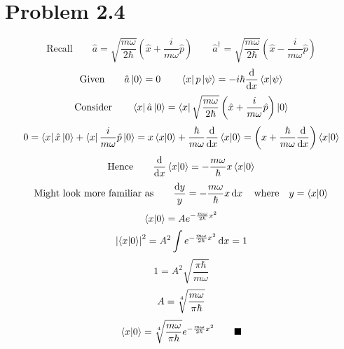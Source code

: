 \documentclass{amsart}
\begin{document}
\section*{Problem 2.4}
\[\text{Recall}\qquad\hat{a}  = \sqrt{\frac{m\omega}{2\hbar}}\left(\hat{x} + \frac{i}{m\omega}\hat{p}\right) \qquad\hat{a}^\dagger  = \sqrt{\frac{m\omega}{2\hbar}}\left(\hat{x} - \frac{i}{m\omega}\hat{p}\right)\]
\[\text{Given}\qquad\hat{a}\ket{0}=0\qquad\bra{x}p\ket{\psi} = -i\hbar \dv{x}\bra{x}\ket{\psi}\]
\[\text{Consider}\qquad\bra{x}\hat{a}\ket{0}= \bra{x}\sqrt{\frac{m\omega}{2\hbar}}\left(\hat{x} + \frac{i}{m\omega}\hat{p}\right)\ket{0}\]
\[0= \bra{x}\hat{x}\ket{0} + \bra{x}\frac{i}{m\omega}\hat{p}\ket{0}=x\bra{x}\ket{0}+\frac{\hbar}{m\omega}\dv{x}\bra{x}\ket{0}=\left(x+\frac{\hbar}{m\omega}\dv{x}\right)\bra{x}\ket{0}\]
\[\text{Hence}\qquad\dv{x}\bra{x}\ket{0}=-\frac{m\omega}{\hbar}x\bra{x}\ket{0}\]
\[\text{Might look more familiar as}\qquad\frac{\dd{y}}{y}=-\frac{m\omega}{\hbar}x\dd{x}\qq{where}y=\bra{x}\ket{0}\]
\[\bra{x}\ket{0}=Ae^{-\frac{m\omega}{2\hbar}x^2}\]
\[\abs{\bra{x}\ket{0}}^2=A^2\int e^{-\frac{m\omega}{2\hbar}x^2}\dd{x}=1\]
\[1=A^2\sqrt{\frac{\pi\hbar}{m\omega}}\]
\[A=\sqrt[\uproot{2}4]{\frac{m\omega}{\pi\hbar}}\]
\[\bra{x}\ket{0}=\sqrt[\uproot{2}4]{\frac{m\omega}{\pi\hbar}}e^{-\frac{m\omega}{2\hbar}x^2}\qquad\blacksquare\]
\end{document}
